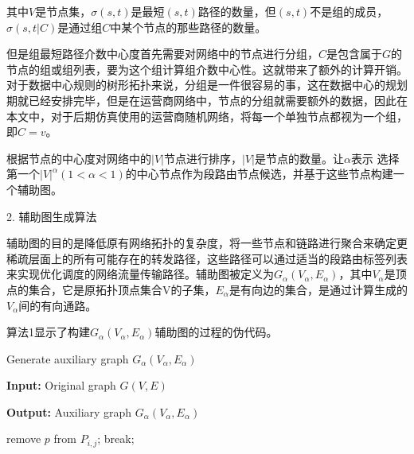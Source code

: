 其中$V$是节点集，$\sigma\left(s,t\right)$是最短$\left(s,t\right)$路径的数量，但$\left(s,t\right)$不是组的成员，$\sigma(s,t|C)$是通过组$C$中某个节点的那些路径的数量。

但是组最短路径介数中心度首先需要对网络中的节点进行分组，$C$是包含属于$G$的节点的组或组列表，要为这个组计算组介数中心性。这就带来了额外的计算开销。对于数据中心规则的树形拓扑来说，分组是一件很容易的事，这在数据中心的规划期就已经安排完毕，但是在运营商网络中，节点的分组就需要额外的数据，因此在本文中，对于后期仿真使用的运营商随机网络，将每一个单独节点都视为一个组，即$C=v$。

根据节点的中心度对网络中的$|V|$节点进行排序，$|V|$是节点的数量。让$\alpha$表示 选择第一个${|V|}^\alpha(1<\alpha<1)$的中心节点作为段路由节点候选，并基于这些节点构建一个辅助图。

2. 辅助图生成算法

辅助图的目的是降低原有网络拓扑的复杂度，将一些节点和链路进行聚合来确定更稀疏层面上的所有可能存在的转发路径，这些路径可以通过适当的段路由标签列表来实现优化调度的网络流量传输路径。辅助图被定义为$G_\alpha\left(V_\alpha,E_\alpha\right)$，其中$V_\alpha$是顶点的集合，它是原拓扑顶点集合V的子集，$E_\alpha$是有向边的集合，是通过计算生成的$V_\alpha$间的有向通路。

算法1显示了构建$G_\alpha\left(V_\alpha,E_\alpha\right)$辅助图的过程的伪代码。

\begin{algorithm}[h]
\setlength{\abovedisplayskip}{8pt}
\setlength{\belowdisplayskip}{2pt}
\caption{Generate auxiliary graph  $G_\alpha(V_\alpha,E_\alpha)$}  
\hspace*{0.02in} {\bf Input:} 
    Original graph $G(V,E)$
    
\hspace*{0.02in} {\bf Output:}
Auxiliary graph  $G_\alpha(V_\alpha,E_\alpha)$
 
\begin{algorithmic}[1]
\STATE remove $p$ from $P_{i,j}$;
\STATE break;
\ENDIF
\ENDFOR
\ENDFOR
{}
\ELSE
{}
\ENDIF
\ENDFOR
\end{algorithmic}

\end{algorithm}

